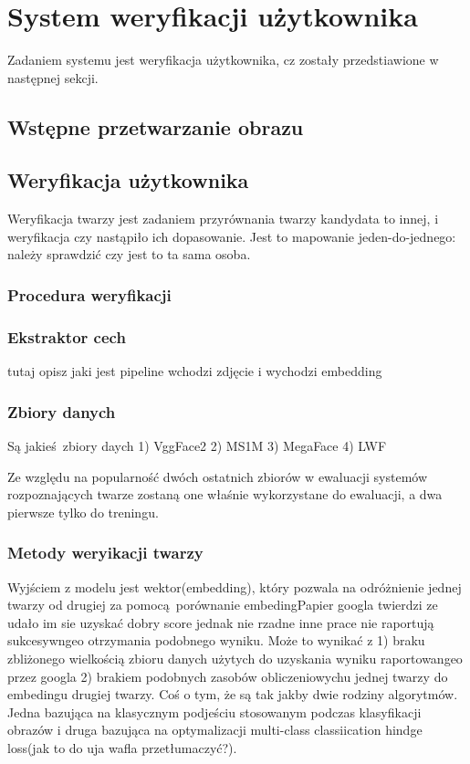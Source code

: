 \section{System weryfikacji użytkownika}
Zadaniem systemu jest weryfikacja użytkownika, cz zostały przedstiawione w następnej sekcji.

\subsection{Wstępne przetwarzanie obrazu}

\subsection{Weryfikacja użytkownika}

Weryfikacja twarzy jest zadaniem przyrównania twarzy
kandydata to innej, i weryfikacja czy nastąpiło ich dopasowanie. Jest to mapowanie
jeden-do-jednego: należy sprawdzić czy jest to ta sama osoba.

\subsubsection{Procedura weryfikacji} 

\subsubsection{Ekstraktor cech}
tutaj opisz jaki jest pipeline  
wchodzi zdjęcie i wychodzi embedding

\subsubsection{Zbiory danych}
Są jakieś zbiory daych 
1) VggFace2
2) MS1M
3) MegaFace
4) LWF

Ze względu na popularność dwóch ostatnich zbiorów w ewaluacji systemów rozpoznających twarze zostaną one właśnie wykorzystane do ewaluacji, a dwa pierwsze tylko do treningu.


\subsubsection{Metody weryikacji twarzy}
Wyjściem z modelu jest wektor(embedding), który pozwala na odróżnienie jednej twarzy od drugiej za pomocą porównanie 
embedingPapier googla twierdzi ze udało im sie uzyskać dobry score jednak nie rzadne inne prace nie raportują sukcesywngeo otrzymania podobnego wyniku. Może to wynikać z 1) braku zbliżonego wielkością zbioru danych użytych do uzyskania wyniku raportowangeo przez googla  2) brakiem podobnych zasobów obliczeniowychu jednej twarzy do embedingu drugiej twarzy.
Coś o tym, że są tak jakby dwie rodziny algorytmów. Jedna bazująca na klasycznym podjeściu stosowanym podczas klasyfikacji obrazów i druga bazująca na optymalizacji multi-class classiication hindge loss(jak to do uja wafla przetłumaczyć?).

